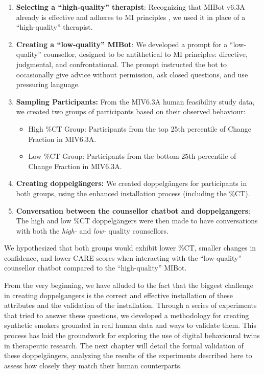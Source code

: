 \begin{enumerate}
    \item \textbf{Selecting a ``high-quality'' therapist}: Recognizing that MIBot v6.3A already is effective and adheres to MI principles \cite{mahmood-etal-2025-fully}, we used it in place of a ``high-quality'' therapist.
    
    \item \textbf{Creating a ``low-quality'' MIBot}: We developed a prompt for a ``low-quality'' counsellor, designed to be antithetical to MI principles: directive, judgmental, and confrontational. The prompt instructed the bot to occasionally give advice without permission, ask closed questions, and use pressuring language.

    \item \textbf{Sampling Participants:} From the MIV6.3A human feasibility study data, we created two groups of participants based on their observed behaviour:

    \begin{itemize}
        \item High \%CT Group: Participants from the top 25th percentile of Change Fraction in MIV6.3A.
        \item Low \%CT Group: Participants from the bottom 25th percentile of Change Fraction in MIV6.3A.
    \end{itemize}



    \item \textbf{Creating doppelgängers:} We created doppelgängers for participants in both groups, using the enhanced installation process (including the \%CT).

    \item \textbf{Conversation between the counsellor chatbot and doppelgangers}: The high and low \%CT doppelgängers were then made to have conversations with both the \textit{high-} and \textit{low-} quality counsellors.
\end{enumerate}

We hypothesized that both groups would exhibit lower \%CT, smaller changes in confidence, and lower CARE scores when interacting with the ``low-quality'' counsellor chatbot compared to the ``high-quality'' MIBot.

From the very beginning, we have alluded to the fact that the biggest challenge in creating doppelgangers is the correct and effective installation of these attributes and the validation of the installation. Through a series of experiments that tried to answer these questions, we developed a methodology for creating synthetic smokers grounded in real human data and ways to validate them. This process has laid the groundwork for exploring the use of digital behavioural twins in therapeutic research. The next chapter will detail the formal validation of these doppelgängers, analyzing the results of the experiments described here to assess how closely they match their human counterparts.

